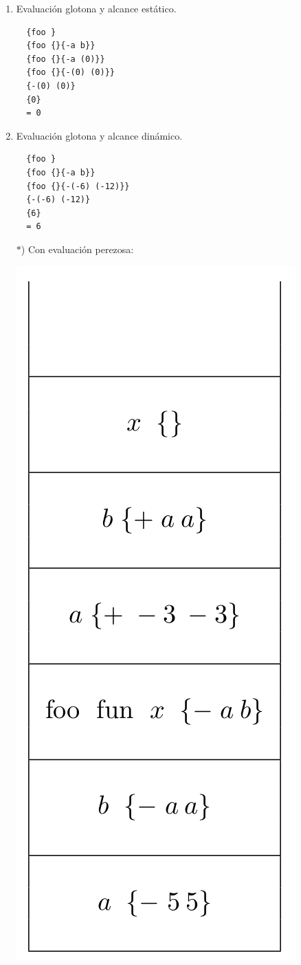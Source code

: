 \begin{enumerate}
  \item Evaluación glotona y alcance estático.
  \begin{lstlisting}
  {foo }
  {foo {}{-a b}}
  {foo {}{-a (0)}}
  {foo {}{-(0) (0)}}
  {-(0) (0)}
  {0}
  = 0
\end{lstlisting}
  \item Evaluación glotona y alcance dinámico.
  \begin{lstlisting}
  {foo }
  {foo {}{-a b}}
  {foo {}{-(-6) (-12)}}
  {-(-6) (-12)}
  {6}
  = 6
\end{lstlisting}

$*$) Con evaluación perezosa:
  \begin{center}
    \includegraphics[scale=0.3]{./PerezosaB}
  \end{center}


\end{enumerate}

